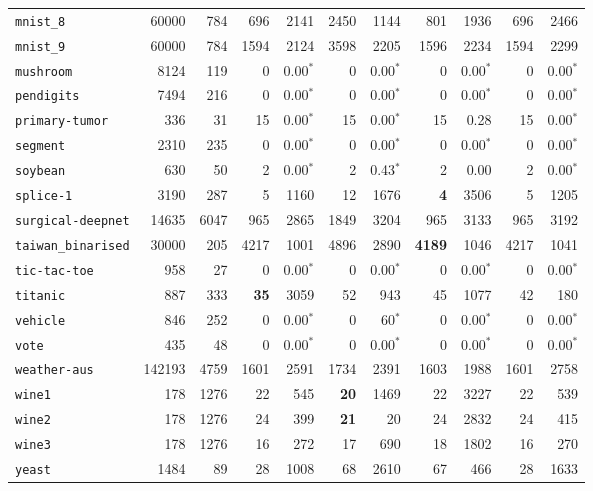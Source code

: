\begin{tabular}{lccrrrrrrrr}
\texttt{mnist\_8} & \multicolumn{1}{r}{60000} & \multicolumn{1}{r}{784}  & 696 & 2141 & 2450 & 1144 & 801 & 1936 & 696 & 2466\\
\texttt{mnist\_9} & \multicolumn{1}{r}{60000} & \multicolumn{1}{r}{784}  & 1594 & 2124 & 3598 & 2205 & 1596 & 2234 & 1594 & 2299\\
\texttt{mushroom} & \multicolumn{1}{r}{8124} & \multicolumn{1}{r}{119}  & 0 & 0.00$^*$ & 0 & 0.00$^*$ & 0 & 0.00$^*$ & 0 & 0.00$^*$\\
\texttt{pendigits} & \multicolumn{1}{r}{7494} & \multicolumn{1}{r}{216}  & 0 & 0.00$^*$ & 0 & 0.00$^*$ & 0 & 0.00$^*$ & 0 & 0.00$^*$\\
\texttt{primary-tumor} & \multicolumn{1}{r}{336} & \multicolumn{1}{r}{31}  & 15 & 0.00$^*$ & 15 & 0.00$^*$ & 15 & 0.28 & 15 & 0.00$^*$\\
\texttt{segment} & \multicolumn{1}{r}{2310} & \multicolumn{1}{r}{235}  & 0 & 0.00$^*$ & 0 & 0.00$^*$ & 0 & 0.00$^*$ & 0 & 0.00$^*$\\
\texttt{soybean} & \multicolumn{1}{r}{630} & \multicolumn{1}{r}{50}  & 2 & 0.00$^*$ & 2 & 0.43$^*$ & 2 & 0.00 & 2 & 0.00$^*$\\
\texttt{splice-1} & \multicolumn{1}{r}{3190} & \multicolumn{1}{r}{287}  & 5 & 1160 & 12 & 1676 & \textbf{4} & 3506 & 5 & 1205\\
\texttt{surgical-deepnet} & \multicolumn{1}{r}{14635} & \multicolumn{1}{r}{6047}  & 965 & 2865 & 1849 & 3204 & 965 & 3133 & 965 & 3192\\
\texttt{taiwan\_binarised} & \multicolumn{1}{r}{30000} & \multicolumn{1}{r}{205}  & 4217 & 1001 & 4896 & 2890 & \textbf{4189} & 1046 & 4217 & 1041\\
\texttt{tic-tac-toe} & \multicolumn{1}{r}{958} & \multicolumn{1}{r}{27}  & 0 & 0.00$^*$ & 0 & 0.00$^*$ & 0 & 0.00$^*$ & 0 & 0.00$^*$\\
\texttt{titanic} & \multicolumn{1}{r}{887} & \multicolumn{1}{r}{333}  & \textbf{35} & 3059 & 52 & 943 & 45 & 1077 & 42 & 180\\
\texttt{vehicle} & \multicolumn{1}{r}{846} & \multicolumn{1}{r}{252}  & 0 & 0.00$^*$ & 0 & 60$^*$ & 0 & 0.00$^*$ & 0 & 0.00$^*$\\
\texttt{vote} & \multicolumn{1}{r}{435} & \multicolumn{1}{r}{48}  & 0 & 0.00$^*$ & 0 & 0.00$^*$ & 0 & 0.00$^*$ & 0 & 0.00$^*$\\
\texttt{weather-aus} & \multicolumn{1}{r}{142193} & \multicolumn{1}{r}{4759}  & 1601 & 2591 & 1734 & 2391 & 1603 & 1988 & 1601 & 2758\\
\texttt{wine1} & \multicolumn{1}{r}{178} & \multicolumn{1}{r}{1276}  & 22 & 545 & \textbf{20} & 1469 & 22 & 3227 & 22 & 539\\
\texttt{wine2} & \multicolumn{1}{r}{178} & \multicolumn{1}{r}{1276}  & 24 & 399 & \textbf{21} & 20 & 24 & 2832 & 24 & 415\\
\texttt{wine3} & \multicolumn{1}{r}{178} & \multicolumn{1}{r}{1276}  & 16 & 272 & 17 & 690 & 18 & 1802 & 16 & 270\\
\texttt{yeast} & \multicolumn{1}{r}{1484} & \multicolumn{1}{r}{89}  & 28 & 1008 & 68 & 2610 & 67 & 466 & 28 & 1633\\
\bottomrule
\end{tabular}

